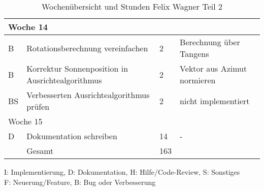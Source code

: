 \begin{table}[!hp]
\begin{center}
\begin{tabular}{|l|p{4.5cm}|p{1cm}|p{9cm}|}
        \multicolumn{4}{|l|}{Woche 14}                                                                      \\ \hline
        B           & Rotationsberechnung vereinfachen & 2 & Berechnung über Tangens                        \\ \hline
        B           & Korrektur Sonnenposition in Ausrichtealgorithmus & 2 & Vektor aus Azimut normieren   \\ \hline
        BS          & Verbesserten Ausrichtealgorithmus prüfen & 2 & nicht implementiert                    \\ \hline
        \multicolumn{4}{|l|}{Woche 15}                                                                      \\ \hline
        D           & Dokumentation schreiben & 14 & -                                                       \\ \hline
        \Xhline{3\arrayrulewidth}
            & Gesamt & 163 & \\ \hline
    \end{tabular}
    \label{tab:overviewFelix2}
\caption{Wochenübersicht und Stunden Felix Wagner Teil 2}
\label{tab:overviewFelix}
\end{center}
I: Implementierung, D: Dokumentation, H: Hilfe/Code-Review, S: Sonstiges\\
F: Neuerung/Feature, B: Bug oder Verbesserung\\
\end{table}
\vspace{1em}


\newpage